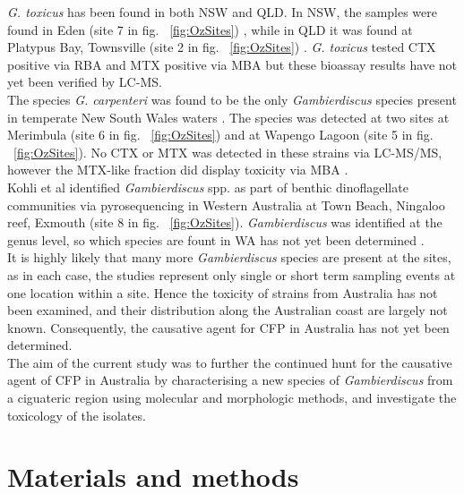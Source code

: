 \documentclass[12pt]{article}
\begin{document}
\emph{G. toxicus} has been found in both NSW and QLD. In NSW, the samples were found in Eden (site 7 in fig. ~\ref{fig:OzSites}) \cite{hallegraeff2010algae}, while in QLD it was found at Platypus Bay, Townsville (site 2 in fig. ~\ref{fig:OzSites}) \cite{hallegraeff2010algae}. \emph{G. toxicus} tested CTX positive via RBA \cite{chinain2010growth} and MTX positive via MBA \cite{chinain1999morphology} but these bioassay results have not yet been verified by LC-MS.\\

The species \emph{G. carpenteri} was found to be the only \emph{Gambierdiscus} species present in temperate New South Wales waters \cite{kohli2014high}. The species was detected at two sites at Merimbula (site 6 in fig. ~\ref{fig:OzSites}) and at Wapengo Lagoon (site 5 in fig. ~\ref{fig:OzSites}). No CTX or MTX was detected in these strains via LC-MS/MS, however the MTX-like fraction did display toxicity via MBA  \cite{kohli2014high}.\\ 

Kohli et al identified \emph{Gambierdiscus} spp. as part of benthic dinoflagellate communities via pyrosequencing in Western Australia at Town Beach, Ningaloo reef, Exmouth (site 8 in fig. ~\ref{fig:OzSites}).  \emph{Gambierdiscus} was identified at the genus level, so which species are fount in WA has not yet been determined \cite{kohli2014cob}. \\

It is highly likely that many more \emph{Gambierdiscus} species are present at the sites, as in each case, the studies represent only single or short term sampling events at one location within a site. Hence the toxicity of strains from Australia has not been examined, and their distribution along the Australian coast are largely not known. Consequently, the causative agent for CFP in Australia has not yet been determined. \\

\FloatBarrier 
The aim of the current study was to further the continued hunt for the causative agent of CFP in Australia by characterising a new species of \emph{Gambierdiscus} from a ciguateric region using molecular and morphologic methods, and investigate the toxicology of the isolates.


 \newpage
\section{Materials and methods}
\end{document}

